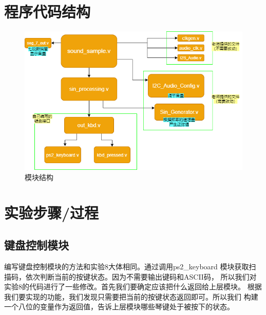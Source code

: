 \documentclass[12pt,a4paper,UTF8]{article}
\begin{document}
\section{程序代码结构}
\begin{figure}[H]
  \centering
  \includegraphics[width=1\textwidth]{code_structure.PNG}
  \caption{模块结构}
  \label{struct}
\end{figure}

\section{实验步骤/过程}
\subsection{键盘控制模块}
编写键盘控制模块的方法和实验8大体相同。通过调用\mbox{ps2\_keyboard}
模块获取扫描码，依次判断当前的按键状态。因为不需要输出键码和ASCII码，
所以我们对实验8的代码进行了一些修改。首先我们要确定应该把什么返回给上层模块。
根据我们要实现的功能，我们发现只需要把当前的按键状态返回即可。所以我们
构建一个八位的变量作为返回值，告诉上层模块哪些琴键处于被按下的状态。
\end{document}
